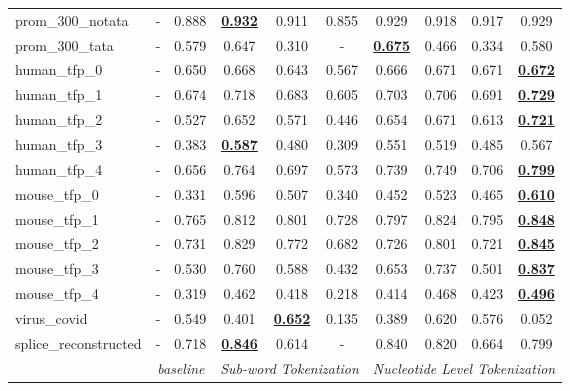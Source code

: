 \begin{table*}[h!]
\begin{center}
\begin{tabular}{l|cc|ccc|cccc}
prom\_300\_notata & - & 0.888 & {\ul \textbf{0.932}} & 0.911 & 0.855 & 0.929 & 0.918 & 0.917 & 0.929 \\
prom\_300\_tata & - & 0.579 & 0.647 & 0.310 & - & {\ul \textbf{0.675}} & 0.466 & 0.334 & 0.580 \\
human\_tfp\_0 & - & 0.650 & 0.668 & 0.643 & 0.567 & 0.666 & 0.671 & 0.671 & {\ul \textbf{0.672}} \\
human\_tfp\_1 & - & 0.674 & 0.718 & 0.683 & 0.605 & 0.703 & 0.706 & 0.691 & {\ul \textbf{0.729}} \\
human\_tfp\_2 & - & 0.527 & 0.652 & 0.571 & 0.446 & 0.654 & 0.671 & 0.613 & {\ul \textbf{0.721}} \\
human\_tfp\_3 & - & 0.383 & {\ul \textbf{0.587}} & 0.480 & 0.309 & 0.551 & 0.519 & 0.485 & 0.567 \\
human\_tfp\_4 & - & 0.656 & 0.764 & 0.697 & 0.573 & 0.739 & 0.749 & 0.706 & {\ul \textbf{0.799}} \\
mouse\_tfp\_0 & - & 0.331 & 0.596 & 0.507 & 0.340 & 0.452 & 0.523 & 0.465 & {\ul \textbf{0.610}} \\
mouse\_tfp\_1 & - & 0.765 & 0.812 & 0.801 & 0.728 & 0.797 & 0.824 & 0.795 & {\ul \textbf{0.848}} \\
mouse\_tfp\_2 & - & 0.731 & 0.829 & 0.772 & 0.682 & 0.726 & 0.801 & 0.721 & {\ul \textbf{0.845}} \\
mouse\_tfp\_3 & - & 0.530 & 0.760 & 0.588 & 0.432 & 0.653 & 0.737 & 0.501 & {\ul \textbf{0.837}} \\
mouse\_tfp\_4 & - & 0.319 & 0.462 & 0.418 & 0.218 & 0.414 & 0.468 & 0.423 & {\ul \textbf{0.496}} \\
virus\_covid & - & 0.549 & 0.401 & {\ul \textbf{0.652}} & 0.135 & 0.389 & 0.620 & 0.576 & 0.052 \\
splice\_reconstructed & - & 0.718 & {\ul \textbf{0.846}} & 0.614 & - & 0.840 & 0.820 & 0.664 & 0.799 \\
\hline
\multicolumn{1}{l|}{} & \multicolumn{2}{c|}{\textit{baseline}} & \multicolumn{3}{c|}{\textit{Sub-word Tokenization}} & \multicolumn{4}{c}{\textit{Nucleotide Level Tokenization}} \\ \hline
\end{tabular}
\end{center}
\end{table*}